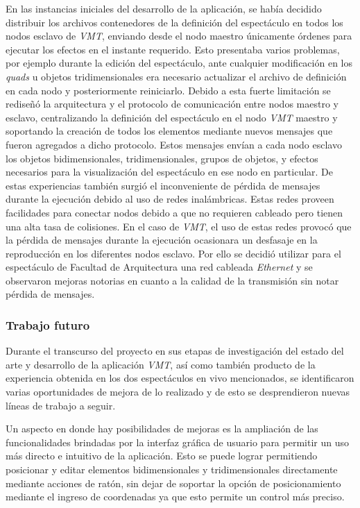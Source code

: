 En las instancias iniciales del desarrollo de la aplicación, se había decidido distribuir los archivos contenedores de la definición del espectáculo en todos los nodos esclavo de \emph{VMT}, enviando desde el nodo maestro únicamente órdenes para ejecutar los efectos en el instante requerido.
Esto presentaba varios problemas, por ejemplo durante la edición del espectáculo, ante cualquier modificación en los \emph{quads} u objetos tridimensionales era necesario actualizar el archivo de definición en cada nodo y posteriormente reiniciarlo.
Debido a esta fuerte limitación se rediseñó la arquitectura y el protocolo de comunicación entre nodos maestro y esclavo, centralizando la definición del espectáculo en el nodo \emph{VMT} maestro y soportando la creación de todos los elementos mediante nuevos mensajes que fueron agregados a dicho protocolo.
Estos mensajes envían a cada nodo esclavo los objetos bidimensionales, tridimensionales, grupos de objetos, y efectos necesarios para la visualización del espectáculo en ese nodo en particular.
De estas experiencias también surgió el inconveniente de pérdida de mensajes durante la ejecución debido al uso de redes inalámbricas. Estas redes proveen facilidades para conectar nodos debido a que no requieren cableado pero tienen una alta tasa de colisiones. En el caso de \emph{VMT}, el uso de estas redes provocó que la pérdida de mensajes durante la ejecución ocasionara un desfasaje en la reproducción en los diferentes nodos esclavo. Por ello se decidió utilizar para el espectáculo de Facultad de Arquitectura una red cableada \emph{Ethernet} y se observaron mejoras notorias en cuanto a la calidad de la transmisión sin notar pérdida de mensajes.

\subsubsection{Trabajo futuro}

Durante el transcurso del proyecto en sus etapas de investigación del estado del arte y desarrollo de la aplicación \emph{VMT}, así como también producto de la experiencia obtenida en los dos espectáculos en vivo mencionados, se identificaron varias oportunidades de mejora de lo realizado y de esto se desprendieron nuevas líneas de trabajo a seguir.

Un aspecto en donde hay posibilidades de mejoras es la ampliación de las funcionalidades brindadas por la interfaz gráfica de usuario para permitir un uso más directo e intuitivo de la aplicación.
Esto se puede lograr permitiendo posicionar y editar elementos bidimensionales y tridimensionales directamente mediante acciones de ratón, sin dejar de soportar la opción de posicionamiento mediante el ingreso de coordenadas ya que esto permite un control más preciso.

